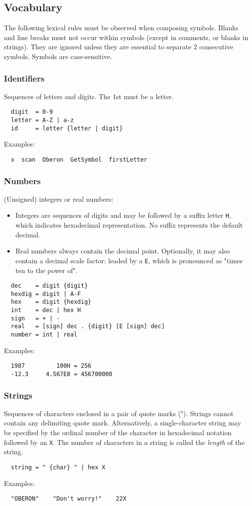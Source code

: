 \subsection{Vocabulary}
The following lexical rules must be observed when composing symbols. Blanks and line breaks must
not occur within symbols (except in comments, or blanks in strings). They are ignored unless
they are essential to separate 2 consecutive symbols. Symbols are case-sensitive.

\subsubsection{Identifiers}
Sequences of letters and digits. The 1st must be a letter.
\begin{verbatim}
  digit  = 0-9
  letter = A-Z | a-z
  id     = letter {letter | digit}
\end{verbatim}
Examples:
\begin{verbatim}
  x  scan  Oberon  GetSymbol  firstLetter
\end{verbatim}

\subsubsection{Numbers}
(Unsigned) integers or real numbers:
\begin{itemize}
  \item Integers are sequences of digits and may be followed by a suffix letter \verb|H|, which
    indicates hexadecimal representation. No suffix represents the default decimal.
  \item Real numbers always contain the decimal point. Optionally, it may also contain a decimal
    scale factor: leaded by a \verb|E|, which is pronounced as "times ten to the power of".
\end{itemize}
\begin{verbatim}
  dec    = digit {digit}
  hexdig = digit | A-F
  hex    = digit {hexdig}
  int    = dec | hex H
  sign   = + | -
  real   = [sign] dec . {digit} [E [sign] dec]
  number = int | real
\end{verbatim}
Examples:
\begin{verbatim}
  1987         100H = 256
  -12.3     4.567E8 = 456700000
\end{verbatim}

\subsubsection{Strings}
Sequences of characters enclosed in a pair of quote marks ("). Strings cannot contain
any delimiting quote mark. Alternatively, a single-character string may be specified
by the ordinal number of the character in hexadecimal notation followed by an \verb|X|.
The number of characters in a string is called the \emph{length} of the string.
\begin{verbatim}
  string = " {char} " | hex X
\end{verbatim}
Examples:
\begin{verbatim}
  "OBERON"    "Don't worry!"    22X
\end{verbatim}

